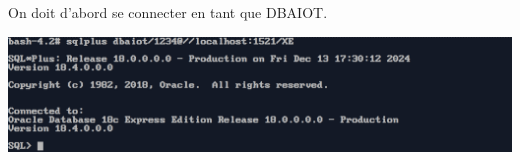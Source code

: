 On doit d'abord se connecter en tant que DBAIOT.



\begin{center}
    \includegraphics[width=\textwidth]{ScreenShot/Partie2/connect.png}
\end{center}


